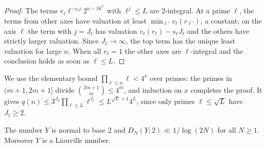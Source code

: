 \documentclass[11pt]{article}
\begin{document}
\begin{proof}
The terms $r_\ell\ell^{-s_\ell j}2^{n-16^{\ell^j}}$ with $\ell^j\le L$ are $2$-integral. At a prime $\ell$,
the terms from other axes have valuation at least $\min_{\ell'}v_\ell(r_{\ell'})$, a constant; on the axis
$\ell$ the term with $j=J_\ell$ has valuation $v_\ell(r_\ell)-s_\ell J_\ell$ and the others have strictly
larger valuation. Since $J_\ell\to\infty$, the top term has the unique least valuation for large $n$.
When all $r_\ell=1$ the other axes are $\ell$-integral and the conclusion holds as soon as $\ell\le L$.
\end{proof}

We use the elementary bound $\prod_{\ell\le x}\ell<4^x$ over primes: the primes in $(m+1,2m+1]$ divide
$\binom{2m+1}{m}\le4^m$, and induction on $x$ completes the proof. It gives
$q(n)\le3^{J_3}\prod_{\ell\le L}\ell^{J_\ell}\le L^{\sqrt L+1}4^L$, since only primes $\ell\le\sqrt L$
have $J_\ell\ge2$.

\begin{theorem}\label{thm:Y}
The number $Y$ is normal to base $2$ and $D_N(Y;2)\ll1/\log(2N)$ for all $N\ge1$. Moreover $Y$ is a
Liouville number.
\end{theorem}
\end{document}
